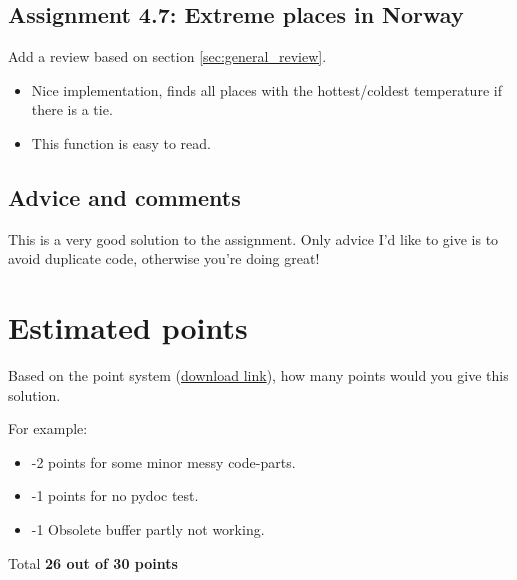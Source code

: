 \documentclass[a4paper]{article}
\begin{document}
\subsection*{Assignment 4.7: Extreme places in Norway}
Add a review based on section \ref{sec:general_review}.

\begin{itemize}
  \item Nice implementation, finds all places with the hottest/coldest temperature if there is a tie.
  \item This function is easy to read.
\end{itemize}

\subsection{Advice and comments}
This is a very good solution to the assignment. Only advice I'd like to give is to avoid duplicate code, otherwise you're doing great!

\section{Estimated points}\label{sec:points}
Based on the point system (\href{http://www.uio.no/studier/emner/matnat/ifi/INF3331/h15/assignments/review_rules.pdf}{download link}),
how many points would you give this solution.

For example:
\begin{itemize}
\item -2 points for some minor messy code-parts.
\item -1 points for no pydoc test.
\item -1 Obsolete buffer partly not working.
\end{itemize}

Total \noindent\textbf{26 out of 30 points}




\end{document}
